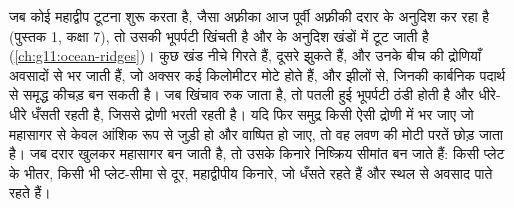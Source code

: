 जब कोई महाद्वीप टूटना शुरू करता है, जैसा अफ़्रीका आज पूर्वी
अफ़्रीकी दरार के अनुदिश कर रहा है (पुस्तक 1, कक्षा 7), तो उसकी भूपर्पटी खिंचती है और
 के अनुदिश खंडों में टूट जाती है (\cref{ch:g11:ocean-ridges})। कुछ खंड नीचे गिरते हैं, दूसरे
झुकते हैं, और उनके बीच की द्रोणियाँ अवसादों से भर जाती हैं, जो अक्सर कई
किलोमीटर मोटे होते हैं, और झीलों से, जिनकी कार्बनिक पदार्थ से समृद्ध कीचड़
 बन सकती है। जब
खिंचाव रुक जाता है, तो पतली हुई भूपर्पटी ठंडी होती है और धीरे-धीरे धँसती रहती है, जिससे
द्रोणी भरती रहती है। यदि फिर समुद्र किसी ऐसी द्रोणी में भर जाए जो महासागर से
केवल आंशिक रूप से जुड़ी हो और वाष्पित हो जाए, तो वह लवण की मोटी परतें
छोड़ जाता है। जब दरार खुलकर महासागर बन जाती है, तो उसके किनारे निष्क्रिय
सीमांत बन जाते हैं: किसी प्लेट के भीतर, किसी भी प्लेट-सीमा से दूर, महाद्वीपीय किनारे, जो
धँसते रहते हैं और स्थल से अवसाद पाते रहते हैं।

